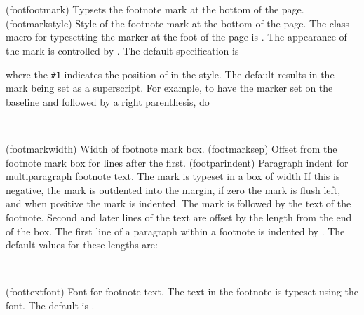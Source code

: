 \begin{syntax}
\cmd{\footfootmark} \\
\cmd{\footmarkstyle} \\
\end{syntax}
\glossary(footfootmark)%
  {}%
  {Typsets the footnote mark at the bottom of the page.}
\glossary(footmarkstyle)%
  {}%
  {Style of the footnote mark at the bottom of the page.}
The class macro for typesetting the marker at the foot of the page is
\cmd{\footfootmark}.  The appearance of the mark is controlled by
\cmd{\footmarkstyle}. The default specification is
\begin{lcode}
\end{lcode}
where the \verb?#1? indicates the position of \cmd{\@thefnmark} in the style.
The default results in the mark being set as a superscript.
For example, to have the marker set on the baseline 
and followed by a right parenthesis, do
\begin{lcode}
\end{lcode}

\begin{syntax}
\lnc{\footmarkwidth} \lnc{\footmarksep} \lnc{\footparindent} \\
\end{syntax}
\glossary(footmarkwidth)%
  {}%
  {Width of footnote mark box.}
\glossary(footmarksep)%
  {}%
  {Offset from the footnote mark box for lines after the first.}
\glossary(footparindent)%
  {}%
  {Paragraph indent for multiparagraph footnote text.}
The mark is typeset in a box of width \lnc{\footmarkwidth}
If this is negative, the mark is outdented
into the margin, if zero the mark is flush left, and when positive
the mark is indented. The mark is followed by the 
text of the footnote. Second and later lines of the
text are offset by the length \lnc{\footmarksep} from the end of the box.
The first line of a paragraph within a footnote is indented by
\lnc{\footparindent}. 
 The default values for these lengths are:
\begin{lcode}
\setlength{\footmarkwidth}{1.8em}
\setlength{\footmarksep}{-\footmarkwidth}
\setlength{\footparindent}{1em}
\end{lcode}


\begin{syntax}
\cmd{\foottextfont} \\
\end{syntax}
\glossary(foottextfont)%
  {}%
  {Font for footnote text.}
The text in the footnote is typeset using 
the \cmd{\foottextfont} font. The default is \cmd{\footnotesize}.


